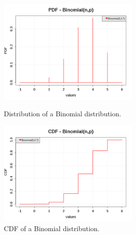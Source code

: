 \begin{figure}[H]
  \begin{minipage}{10cm}
    \begin{center}
      \includegraphics[width=7cm]{pdf_Binomial.png}
      \caption{Distribution of a Binomial distribution.}
      \label{PDFBinomial}
    \end{center}
  \end{minipage}
  \hfill
  \begin{minipage}{10cm}
    \begin{center}
      \includegraphics[width=7cm]{cdf_Binomial.png}
      \caption{CDF of a Binomial distribution.}
      \label{CDFBinomial}
    \end{center}
  \end{minipage}
\end{figure}




